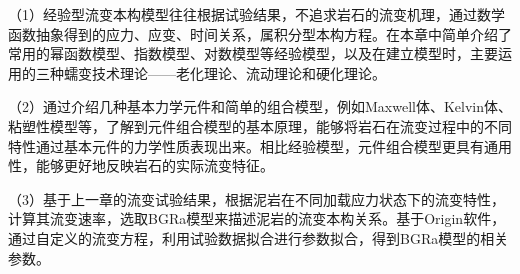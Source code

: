 （1）经验型流变本构模型往往根据试验结果，不追求岩石的流变机理，通过数学函数抽象得到的应力、应变、时间关系，属积分型本构方程。在本章中简单介绍了常用的幂函数模型、指数模型、对数模型等经验模型，以及在建立模型时，主要运用的三种蠕变技术理论——老化理论、流动理论和硬化理论。

（2）通过介绍几种基本力学元件和简单的组合模型，例如Maxwell体、Kelvin体、粘塑性模型等，了解到元件组合模型的基本原理，能够将岩石在流变过程中的不同特性通过基本元件的力学性质表现出来。相比经验模型，元件组合模型更具有通用性，能够更好地反映岩石的实际流变特征。

（3）基于上一章的流变试验结果，根据泥岩在不同加载应力状态下的流变特性，计算其流变速率，选取BGRa模型来描述泥岩的流变本构关系。基于Origin软件，通过自定义的流变方程，利用试验数据拟合进行参数拟合，得到BGRa模型的相关参数。






